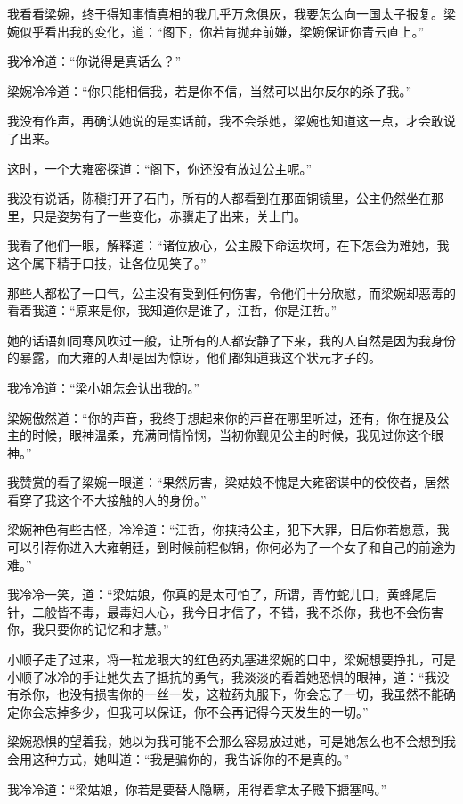 我看看梁婉，终于得知事情真相的我几乎万念俱灰，我要怎么向一国太子报复。梁婉似乎看出我的变化，道：“阁下，你若肯抛弃前嫌，梁婉保证你青云直上。”

我冷冷道：“你说得是真话么？”

梁婉冷冷道：“你只能相信我，若是你不信，当然可以出尔反尔的杀了我。”

我没有作声，再确认她说的是实话前，我不会杀她，梁婉也知道这一点，才会敢说了出来。

这时，一个大雍密探道：“阁下，你还没有放过公主呢。”

我没有说话，陈稹打开了石门，所有的人都看到在那面铜镜里，公主仍然坐在那里，只是姿势有了一些变化，赤骥走了出来，关上门。

我看了他们一眼，解释道：“诸位放心，公主殿下命运坎坷，在下怎会为难她，我这个属下精于口技，让各位见笑了。”

那些人都松了一口气，公主没有受到任何伤害，令他们十分欣慰，而梁婉却恶毒的看着我道：“原来是你，我知道你是谁了，江哲，你是江哲。”

她的话语如同寒风吹过一般，让所有的人都安静了下来，我的人自然是因为我身份的暴露，而大雍的人却是因为惊讶，他们都知道我这个状元才子的。

我冷冷道：“梁小姐怎会认出我的。”

梁婉傲然道：“你的声音，我终于想起来你的声音在哪里听过，还有，你在提及公主的时候，眼神温柔，充满同情怜悯，当初你觐见公主的时候，我见过你这个眼神。”

我赞赏的看了梁婉一眼道：“果然厉害，梁姑娘不愧是大雍密谍中的佼佼者，居然看穿了我这个不大接触的人的身份。”

梁婉神色有些古怪，冷冷道：“江哲，你挟持公主，犯下大罪，日后你若愿意，我可以引荐你进入大雍朝廷，到时候前程似锦，你何必为了一个女子和自己的前途为难。”

我冷冷一笑，道：“梁姑娘，你真的是太可怕了，所谓，青竹蛇儿口，黄蜂尾后针，二般皆不毒，最毒妇人心，我今日才信了，不错，我不杀你，我也不会伤害你，我只要你的记忆和才慧。”

小顺子走了过来，将一粒龙眼大的红色药丸塞进梁婉的口中，梁婉想要挣扎，可是小顺子冰冷的手让她失去了抵抗的勇气，我淡淡的看着她恐惧的眼神，道：“我没有杀你，也没有损害你的一丝一发，这粒药丸服下，你会忘了一切，我虽然不能确定你会忘掉多少，但我可以保证，你不会再记得今天发生的一切。”

梁婉恐惧的望着我，她以为我可能不会那么容易放过她，可是她怎么也不会想到我会用这种方式，她叫道：“我是骗你的，我告诉你的不是真的。”

我冷冷道：“梁姑娘，你若是要替人隐瞒，用得着拿太子殿下搪塞吗。”

